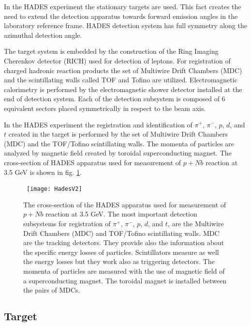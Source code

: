 In the HADES experiment the stationary targets are used. 
This fact creates the need to extend the detection apparatus towards forward emission 
angles in the laboratory reference frame. 
HADES detection system has full symmetry along the azimuthal detection angle. 

The target system is embedded by the construction of the Ring Imaging Cherenkov detector (RICH) 
used for detection of leptons.
For registration of charged hadronic reaction products the set of Multiwire Drift Chambers (MDC) 
and the scintillating walls called TOF and Tofino are utilized. Electromagnetic calorimetry 
is performed by the electromagnetic shower detector installed at the end of detection system.
Each of the detection subsystem is composed of 6 equivalent sectors placed symmetrically in respect to the beam axis.


In the HADES experiment the registration and identification of $\pi^+$, $\pi^-$, $p$, $d$, and $t$ created in the target  
is performed by the set of Multiwire Drift Chambers (MDC) and the TOF/Tofino scintillating walls.
The momenta of particles are analyzed by magnetic field created by toroidal superconducting magnet.
The cross-section of HADES apparatus used for measurement of $p+Nb$ reaction at 3.5 GeV 
is shown in fig. \ref{HadesV2}.

\begin{figure}
	\centering\
	\texttt{[image: HadesV2]}
	\caption{The cross-section of the HADES apparatus used for  
measurement of $p+Nb$ reaction at 3.5 GeV. The most important 
detection subsystems for registration of $\pi^+$, $\pi^-$, $p$, $d$, and $t$, 
are the Multiwire Drift Chambers (MDC) and TOF/Tofino scintillating walls. 
MDC are the tracking detectors. They provide also the information about the specific 
energy losses of particles. Scintillators measure as well the energy losses 
but they work also as triggering detectors.
The momenta of particles are measured with the use of magnetic field 
of a superconducting magnet. The toroidal magnet is installed between the pairs of MDCs.}
\label{HadesV2}
\end{figure} 


\subsection{Target}

